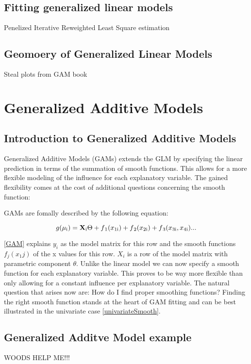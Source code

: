 \documentclass{article}
\begin{document}
    \subsection{Fitting generalized linear models}
    Penelized Iterative Reweighted Least Square estimation
    \subsection{Geomoery of Generalized Linear Models}
    Steal plots from GAM book

    \section{Generalized Additive Models}
    \subsection{Introduction to Generalized Additive Models}
    Generalized Additive Models (GAMs) extends the GLM by specifying the linear prediction in terms of the summation of smooth functions. This allows for a more flexible modeling of the influence for each explanatory variable. The gained flexibility comes at the cost of additional questions concerning the smooth function:

    GAMs are fomally described by the following equation:

    \begin{equation} \label{GAM} g(\mu\textsubscript{i}) = \mathbf{X} \textsubscript{i} \Theta + f\textsubscript{1}(x\textsubscript{1i}) + f\textsubscript{2}(x\textsubscript{2i}) + f\textsubscript{3}(x\textsubscript{3i}, x\textsubscript{4i}) ... \end{equation}

    \ref{GAM} explains $y_i$ as the model matrix for this row and the smooth functions $f_j(x_1j)$ of the x values for this row. $X_i$ is a row of the model matrix with parametric component $\theta$. Unlike the linear model we can now  specify a smooth function for each explanatory variable. This proves to be way more flexible than only allowing for a constant influence per explanatory variable. The natural question that arises now are: How do I find proper smoothing functions? Finding the right smooth function stands at the heart of GAM fitting and can be best illustrated in the univariate case \ref{univariateSmooth}.

    \subsection{Generalized Additve Model example}
    WOODS HELP ME!!!
\end{document}
